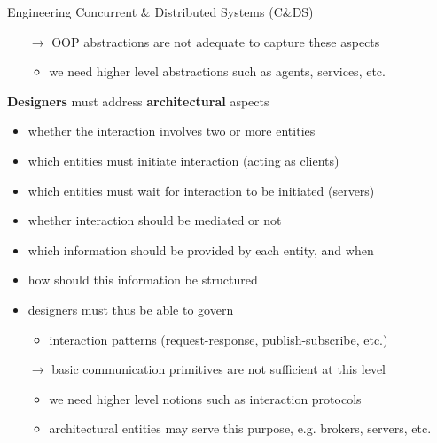 \documentclass[presentation]{beamer}\mode<presentation>{\usetheme{AMSBolognaFC}}
\begin{document}
\begin{frame}[c,allowframebreaks]{Engineering Concurrent \& Distributed Systems (C\&DS)}
\begin{itemize}
        \bigskip

        \item[$\rightarrow$] OOP abstractions are not adequate to capture these aspects
        \begin{itemize}
            \item we need higher level abstractions such as agents, services, etc.
        \end{itemize}
    \end{itemize}

    \framebreak

    \begin{block}{\textbf{Designers} must address \textbf{architectural} aspects}
        \begin{itemize}
            \item whether the interaction involves \alert{two or more} entities
            \item which entities must \alert{initiate} interaction (acting as clients)
            \item which entities must \alert{wait} for interaction to be initiated (servers)
            \item whether interaction should be \alert{mediated} or not
            \item which information should be provided by each entity, and \alert{when}
            \item how should this information be \alert{structured}
        \end{itemize}
    \end{block}

    \bigskip

    \begin{itemize}
        \item designers must thus be able to govern
        \begin{itemize}
            \item interaction patterns (request-response, publish-subscribe, etc.)
        \end{itemize}

        \bigskip

        \item[$\rightarrow$] basic communication primitives are not sufficient at this level
        \begin{itemize}
            \item we need higher level notions such as \alert{interaction protocols}
            \item architectural entities may serve this purpose, e.g. brokers, servers, etc.
        \end{itemize}
    \end{itemize}


\end{frame}
\end{document}
